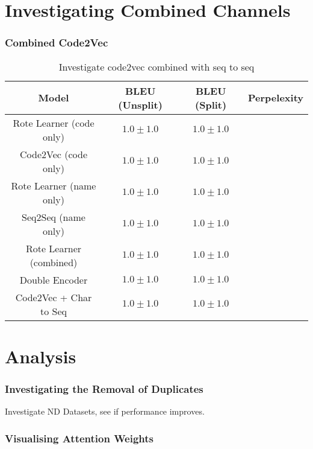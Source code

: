 \section{Investigating Combined Channels} %
\label{sec:investigating_combined_channels}

\subsubsection{Combined Code2Vec } %
\label{ssub:combined_code2vec}


\begin{table}[h!]
\begin{center}
\begin{tabular}{ c | c | c | c }
    Model                             & BLEU (Unsplit)  & BLEU (Split)    & Perpelexity \\
    \hline
    Rote Learner  (code only)         & $1.0 \pm 1.0 $  & $1.0 \pm 1.0 $  &  \\
    Code2Vec  (code only)             & $1.0 \pm 1.0 $  & $1.0 \pm 1.0 $  &  \\
    \hline
    \hline
    Rote Learner  (name only)         & $1.0 \pm 1.0 $  & $1.0 \pm 1.0 $  &  \\
    Seq2Seq  (name only)              & $1.0 \pm 1.0 $  & $1.0 \pm 1.0 $  &  \\
    \hline
    \hline
    Rote Learner (combined)           & $1.0 \pm 1.0 $  & $1.0 \pm 1.0 $  & \\
    Double Encoder                    & $1.0 \pm 1.0 $  & $1.0 \pm 1.0 $  &  \\
    Code2Vec  + Char to Seq           & $1.0 \pm 1.0 $  & $1.0 \pm 1.0 $  &  \\
    \hline
\end{tabular}
\caption {Investigate code2vec combined with seq to seq}
\label{table:code2vec_embed}
\end{center}
\end{table}





\section{Analysis} %
\label{sec:analysis}


\subsubsection{Investigating the Removal of Duplicates} %
\label{ssub:investigating_the_removal_of_duplicates}

Investigate ND Datasets, see if performance improves.

\subsubsection{Visualising Attention Weights} %
\label{ssub:visualising_attention_weights}

